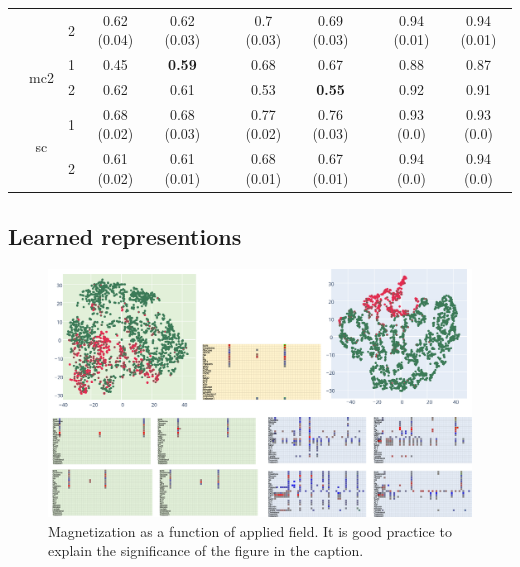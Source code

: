 \documentclass[journal,twoside,web]{ieeecolor}
\begin{document}
\begin{table}[htbp]
\begin{tabular}{ccccccccccc}
            &       & 2     & 0.62 (0.04) & 0.62 (0.03) &       & 0.7 (0.03) & 0.69 (0.03) &       & 0.94 (0.01) & 0.94 (0.01) \\
  \cmidrule{2-11}          & \multirow{2}[2]{*}{mc2} & 1     & 0.45  & \textbf{0.59} &       & 0.68  & 0.67  &       & 0.88  & 0.87 \\
            &       & 2     & 0.62  & 0.61  &       & 0.53  & \textbf{0.55} &       & 0.92  & 0.91 \\
  \cmidrule{2-11}          & \multirow{2}[2]{*}{sc} & 1     & 0.68 (0.02) & 0.68 (0.03) &       & 0.77 (0.02) & 0.76 (0.03) &       & 0.93 (0.0) & 0.93 (0.0) \\
            &       & 2     & 0.61 (0.02) & 0.61 (0.01) &       & 0.68 (0.01) & 0.67 (0.01) &       & 0.94 (0.0) & 0.94 (0.0) \\
      \bottomrule
      \bottomrule
      \end{tabular}%
    \label{tab:3}%
  \end{table}%
  
  








\subsection{Learned representions}



\begin{figure}[!t]
    \centerline{\includegraphics{images/tsne.png}}
    \caption{Magnetization as a function of applied field.
    It is good practice to explain the significance of the figure in the caption.}
    \label{fig2}
    \end{figure}
\end{document}
